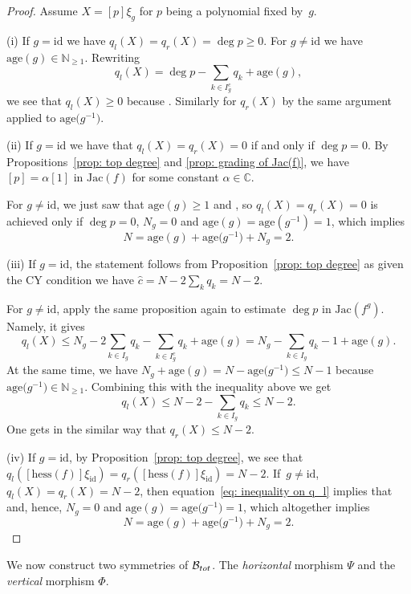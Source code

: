 \documentclass[10pt,a4paper]{article}
\numberwithin{equation}{section}
\newcommand{\CC}{{\mathbb{C}}}
\newcommand{\NN}{{\mathbb{N}}}
\newcommand{\Jac}{\mathrm{Jac}}
\newcommand{\id}{\mathrm{id}}
\newcommand{\hess}{\mathrm{hess}}
\newcommand{\age}{\mathrm{age}}
\def\B{{\mathcal B}}
\begin{document}
\begin{proof}
	Assume $X = [p]\xi_g$ for $p$ being a polynomial fixed by~$g$.

	(i) If $g = \id$ we have $q_l(X) = q_r(X) = \deg p \ge 0$. For $g \neq \id$ we have $\age(g) \in \NN_{\ge 1}$. Rewriting
	\[
		q_l(X) = \deg p -\sum_{k \in I_g^c} q_{k} + \age(g),
	\]
	we see that $q_l(X) \ge 0$ because . Similarly for $q_r(X)$ by the same argument applied to $\age\bigl(g^{-1}\bigr)$.

	(ii) If $g = \id$ we have that $q_l(X) = q_r(X) = 0$ if and only if $\deg p = 0$. By Propositions~\ref{prop: top degree} and \ref{prop: grading of Jac(f)}, we have $[p] = \alpha [1]$ in $\Jac(f)$ for some constant $\alpha \in \CC$.

	For $g \neq \id$, we just saw that $\age(g)\ge 1$ and , so $q_l(X) = q_r(X) = 0$ is achieved only if $\deg p=0$, $N_g=0$ and $\age(g)=\age(g^{-1})=1$, which implies \[N=\age(g)+\age\bigl(g^{-1}\bigr)+N_g=2.\]


	(iii) If $g=\id$, the statement follows from Proposition~\ref{prop: top degree} as given the CY condition we have $\hat{c}=N-2\sum_k q_k=N-2$.

 For $g \neq \id $, apply the same proposition again to estimate $\deg p$ in $\Jac(f^g)$. Namely, it gives
	\[
		q_l(X) \le N_g - 2\sum_{k \in I_g}q_k - \sum_{k \in I_g^c} q_{k}+ \age(g) = N_g - \sum_{k \in I_g}q_k -1 + \age(g).
	\]
	At the same time, we have $N_g + \age(g) = N - \age\bigl(g^{-1}\bigr) \le N-1$ because $\age\bigl(g^{-1}\bigr) \in \NN_{\ge 1}$. Combining this with the inequality above we get
\begin{equation}\label{eq: inequality on q_l}
		q_l(X) \le N - 2 - \sum_{k \in I_g}q_k \le N - 2.
\end{equation}
	One gets in the similar way that $q_r(X) \le N-2$.

	(iv) If $g = \id$, by Proposition~\ref{prop: top degree}, we see that $q_l([\hess(f)]\xi_\id)=q_r([\hess(f)]\xi_\id)=N-2$. If~$g \neq \id$, $q_l(X) = q_r(X) = N-2$, then equation~\eqref{eq: inequality on q_l} implies that  and, hence, $N_g=0$ and $\age(g)=\age\bigl(g^{-1}\bigr)=1$, which altogether implies \[N=\age(g)+\age\bigl(g^{-1}\bigr)+N_g=2.\tag*{\qed} \]\renewcommand{\qed}{}
\end{proof}

We now construct two symmetries of $\B_{\rm tot}$. The \textit{horizontal} morphism $\Psi$ and the \textit{vertical} morphism $\Phi$.
\end{document}
